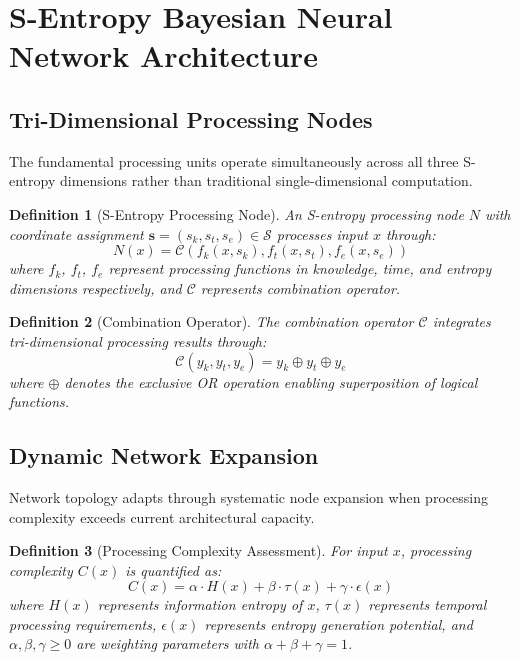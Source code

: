 \documentclass[12pt,a4paper]{article}
\newtheorem{definition}{Definition}
\begin{document}
\section{S-Entropy Bayesian Neural Network Architecture}

\subsection{Tri-Dimensional Processing Nodes}

The fundamental processing units operate simultaneously across all three S-entropy dimensions rather than traditional single-dimensional computation.

\begin{definition}[S-Entropy Processing Node]
An S-entropy processing node $N$ with coordinate assignment $\mathbf{s} = (s_k, s_t, s_e) \in \mathcal{S}$ processes input $x$ through:
\begin{equation}
N(x) = \mathcal{C}(f_k(x, s_k), f_t(x, s_t), f_e(x, s_e))
\end{equation}
where $f_k$, $f_t$, $f_e$ represent processing functions in knowledge, time, and entropy dimensions respectively, and $\mathcal{C}$ represents combination operator.
\end{definition}

\begin{definition}[Combination Operator]
The combination operator $\mathcal{C}$ integrates tri-dimensional processing results through:
\begin{equation}
\mathcal{C}(y_k, y_t, y_e) = y_k \oplus y_t \oplus y_e
\end{equation}
where $\oplus$ denotes the exclusive OR operation enabling superposition of logical functions.
\end{definition}

\subsection{Dynamic Network Expansion}

Network topology adapts through systematic node expansion when processing complexity exceeds current architectural capacity.

\begin{definition}[Processing Complexity Assessment]
For input $x$, processing complexity $C(x)$ is quantified as:
\begin{equation}
C(x) = \alpha \cdot H(x) + \beta \cdot \tau(x) + \gamma \cdot \epsilon(x)
\end{equation}
where $H(x)$ represents information entropy of $x$, $\tau(x)$ represents temporal processing requirements, $\epsilon(x)$ represents entropy generation potential, and $\alpha, \beta, \gamma \geq 0$ are weighting parameters with $\alpha + \beta + \gamma = 1$.
\end{definition}
\end{document}

